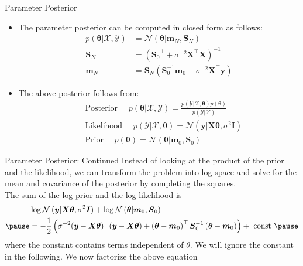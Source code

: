 \documentclass{beamer}
\begin{document}
\begin{frame}{Parameter Posterior}
\begin{itemize}[<+->]
\item The parameter posterior can be computed in closed form as follows:
\begin{equation*}
\begin{aligned}
p(\boldsymbol{\theta} | \mathcal{X}, \mathcal{Y}) &=\mathcal{N}\left(\boldsymbol{\theta} | \boldsymbol{m}_{N}, \boldsymbol{S}_{N}\right) \\
\boldsymbol{S}_{N} &=\left(\boldsymbol{S}_{0}^{-1}+\sigma^{-2} \mathbf{X}^{\top} \boldsymbol{X}\right)^{-1} \\
\boldsymbol{m}_{N} &=\boldsymbol{S}_{N}\left(\boldsymbol{S}_{0}^{-1} \boldsymbol{m}_{0}+\sigma^{-2} \boldsymbol{X}^{\top} \boldsymbol{y}\right)
\end{aligned}
\end{equation*}
\item The above posterior follows from:
\begin{equation*}
\begin{aligned}
&\text { Posterior } \quad p(\boldsymbol{\theta} | \mathcal{X}, \mathcal{Y})=\frac{p(\mathcal{Y} | \mathcal{X}, \boldsymbol{\theta}) p(\boldsymbol{\theta})}{p(\mathcal{Y} | \mathcal{X})}\\
&\text { Likelihood } \quad p(\mathcal{Y} | \mathcal{X}, \boldsymbol{\theta})=\mathcal{N}\left(\boldsymbol{y} | \boldsymbol{X} \boldsymbol{\theta}, \sigma^{2} \boldsymbol{I}\right)\\
&\text { Prior } \quad p(\boldsymbol{\theta})=\mathcal{N}\left(\boldsymbol{\theta} | \boldsymbol{m}_{0}, \boldsymbol{S}_{0}\right)
\end{aligned}
\end{equation*}
\end{itemize}
\end{frame}

\begin{frame}{Parameter Posterior: Continued}
Instead of looking at the product of the prior and the likelihood, we can transform the problem into log-space and solve for the mean and covariance of the posterior by completing the squares.\\
The sum of the log-prior and the log-likelihood is 
\begin{equation*}
\begin{aligned}
&\log \mathcal{N}\left(\boldsymbol{y} | \boldsymbol{X} \boldsymbol{\theta}, \sigma^{2} \boldsymbol{I}\right)+\log \mathcal{N}\left(\boldsymbol{\theta} | \boldsymbol{m}_{0}, \boldsymbol{S}_{0}\right)\\
\pause
&=-\frac{1}{2}\left(\sigma^{-2}(\boldsymbol{y}-\boldsymbol{X} \boldsymbol{\theta})^{\top}(\boldsymbol{y}-\boldsymbol{X} \boldsymbol{\theta})+\left(\boldsymbol{\theta}-\boldsymbol{m}_{0}\right)^{\top} \boldsymbol{S}_{0}^{-1}\left(\boldsymbol{\theta}-\boldsymbol{m}_{0}\right)\right)+\text { const }
\pause
\end{aligned}
\end{equation*}
where the constant contains terms independent of $\theta$. We will ignore the
constant in the following. We now factorize the above equation
\end{frame}
\end{document}
